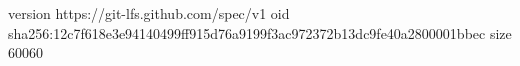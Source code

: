 version https://git-lfs.github.com/spec/v1
oid sha256:12c7f618e3e94140499ff915d76a9199f3ac972372b13dc9fe40a2800001bbec
size 60060
